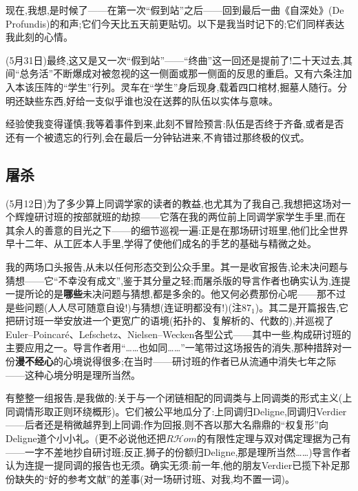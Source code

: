 现在,我想,是时候了——在第一次“假到站”之后——回到最后一曲《自深处》(De Profundis)的和声;它们今天比五天前更贴切。以下是我当时记下的;它们同样表达我此刻的心情。

(5月31日)最终,这又是又一次“假到站”——“终曲”这一回还是提前了!二十天过去,其间“总务活”不断爆成对被忽视的这一侧面或那一侧面的反思的重启。又有六条注加入本该压阵的“学生”行列。灵车在“学生”身后现身,载着四口棺材,掘墓人随行。分明还缺些东西,好给一支似乎谁也没在送葬的队伍以实体与意味。

经验使我变得谨慎;我等着事件到来,此刻不冒险预言:队伍是否终于齐备,或者是否还有一个被遗忘的行列,会在最后\dmark{}一分钟钻进来,不肯错过那终极的仪式。

\subsection{屠杀}


(5月12日)为了多少算上同调学家的读者的教益,也尤其为了我自己,我想把这场对一个辉煌研讨班的按部就班的劫掠——它落在我的两位前上同调学家学生手里,而在其余人的善意的目光之下——的细节巡视一遍:正是在那场研讨班里,他们比全世界早十二年、从工匠本人手里,学得了使他们成名的手艺的基础与精微之处。

我的两场口头报告,从未以任何形态交到公众手里。其一是收官报告,论未决问题与猜想——它“不幸没有成文”,鉴于其分量之轻;而屠杀版的导言作者也确实认为,连提一提所论的是\textbf{哪些}未决问题与猜想,都是多余的。他又何必费那份心呢——那不过是些问题(人人尽可随意自设!)与猜想(连证明都没有!)(注87$_{1}$)。其二是开篇报告,它把研讨班一举安放进一个更宽广的语境(拓扑的、复解析的、代数的),并巡视了Euler--Poincaré、Lefschetz、Nielsen--Wecken各型公式——其中一些,构成研讨班的主要应用之一。导言作者用“……也如同……”一笔带过这场报告的消失,那种措辞对一份\textbf{漫不经心}的心境说得很多;在当时——研讨班的作者已从流通中消失七年之际——这种心境分明是理所当然。

有整整一组报告,是我做的:关于与一个闭链相配的同调类与上同调类的形式主义(上同调情形取正则环绕概形)。它们被公平地瓜分了:上同调归Deligne,同调归Verdier——后者还是稍微越界到上同调;作为回报,则不吝以那大名鼎鼎的“权复形”向Deligne道个小小礼\dmark{}。(更不必说他还把$R\mathcal{H}om$的有限性定理与双对偶定理据为己有——一字不差地抄自研讨班;反正,狮子的份额归Deligne,那是理所当然……)导言作者认为连提一提同调的报告也无须。确实无须:前一年,他的朋友Verdier已揽下补足那份缺失的“好的参考文献”的差事(对一场研讨班、对我,均不置一词)。

